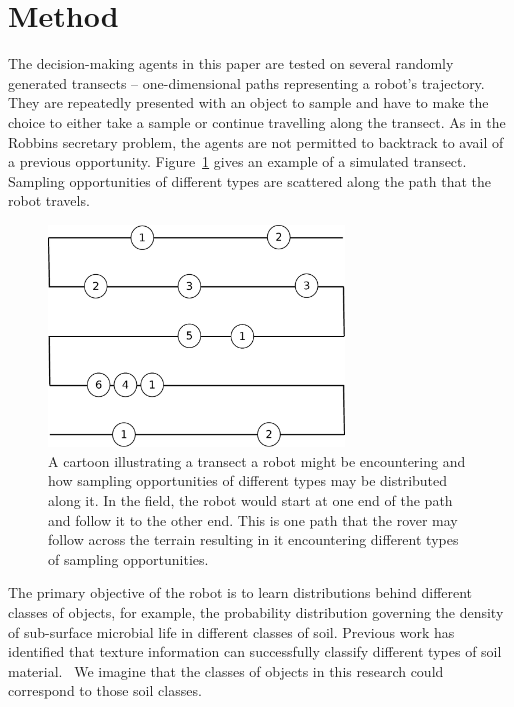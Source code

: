 \section{Method}
\label{sec:method}

The decision-making agents in this paper are tested on several randomly
generated transects -- one-dimensional paths representing a robot's trajectory.  They are repeatedly presented with an object to sample
and have to make the choice to either take a sample or continue travelling
along the transect.  As in the Robbins secretary problem, the agents are not
permitted to backtrack to avail of a previous opportunity.  Figure~\ref{fig:transect} gives an example of a simulated transect. Sampling opportunities of different types are scattered along the path that the robot travels.  

\begin{figure}[htpd!]
	\centering 
	\includegraphics[width=0.7\textwidth]{transect}
	\caption{A cartoon illustrating a transect a robot might be encountering and how sampling opportunities of different types may be distributed along it.  In the field, the robot would start at one end of the path and follow it to the other end.  This is one path that the rover may follow across the terrain resulting in it encountering different types of sampling opportunities.}
	\label{fig:transect}
\end{figure}


The primary objective of the robot is to learn distributions behind different
classes of objects, for example, the probability distribution
governing the density of sub-surface microbial life in different classes of
soil.  Previous work has identified that texture information can successfully
classify different types of soil material.~\cite{dunlop2006automatic}  
We imagine that the classes of objects in this research could correspond to those soil classes.


